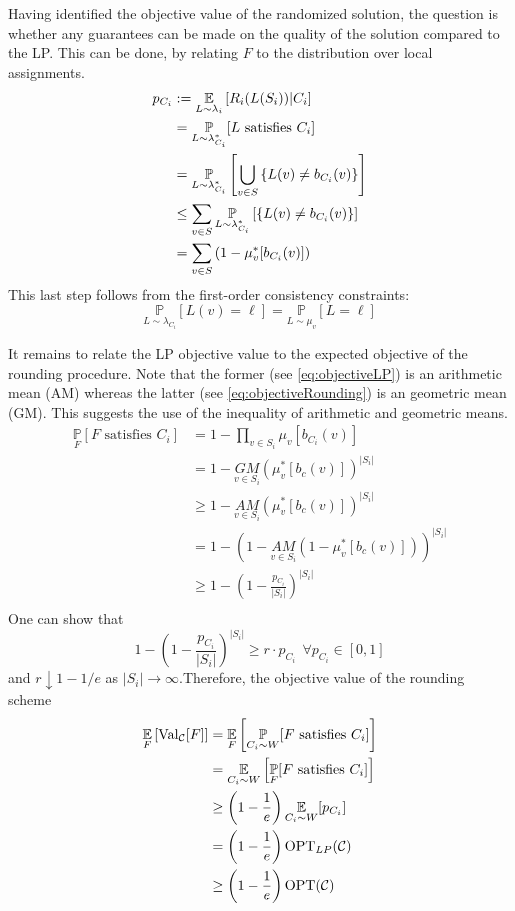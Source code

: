Having identified the objective value of the randomized solution, the question is whether any guarantees can be made on the quality of the solution compared to the LP. 
This can be done, by relating $F$ to the distribution over local assignments.
\begin{align}
	p_{C_i} &:=  \underset{L \sim \lambda_{i}}{\mathbb{E}} \left[ R_i( L (S_i )) |C_i \right]\nonumber\\
			&= \underset{L \sim \lambda_{C_i}^*}{\mathbb{P}} [L \text{ satisfies } C_i] \nonumber\\
			&=  \underset{L \sim \lambda_{C_i}^*}{\mathbb{P}}\left[ \bigcup_{v \in S} \left\{ L(v) \neq b_{C_i}(v) \right\} \right] \nonumber\\
			&\le \sum_{v \in  S } \underset{L \sim \lambda_{C_i}^*}{\mathbb{P}} \left[  \left\{ L(v) \neq b_{C_i}(v) \right\} \right] \nonumber\\
			&= \sum_{v \in S} \left( 1 - \mu_v^*[b_{C_i}(v)] \right) \label{eq:objectiveLP}
\end{align}
This last step follows from the first-order consistency constraints:
\[
	\underset{L \sim \lambda_{C_i} }{\mathbb{P}}[ L(v) = \ell] = \underset{L \sim \mu_v }{\mathbb{P}}[ L = \ell]
\]

It remains to relate the LP objective value to the expected objective of the rounding procedure. 
Note that the former (see \eqref{eq:objectiveLP}) is an arithmetic mean (AM) whereas the latter (see \eqref{eq:objectiveRounding}) is an geometric mean (GM). 
This suggests the use of the inequality of arithmetic and geometric means.
\begin{align*}
		\underset{F}{\mathbb{P}}[ F \text{ satisfies } C_i] &= 1 - \prod_{v \in S_i} \mu_v[b_{C_i}(v)]\\
		&= 1 - \underset{v \in S_i}{GM}(\mu_{v}^*[b_c(v)])^{|S_i|}\\
		&\ge 1 - \underset{v \in S_i}{AM}(\mu_{v}^*[b_c(v)])^{|S_i|}\\
		&= 1 - \left( 1  - \underset{v \in S_i}{AM}(1 -\mu_{v}^*[b_c(v)]) \right)^{|S_i|}\\
		&\ge 1 - \left( 1  - \frac{p_{C_i}}{|S_i|}\right)^{|S_i|}\\
\end{align*}
One can show that $$1 - \left( 1  - \frac{p_{C_i}}{|S_i|}\right)^{|S_i|} \geq r \cdot p_{C_i} ~\ \forall p_{C_i} \in [0, 1]$$ and $r \downarrow 1-1/e$ as $|S_i| \rightarrow \infty$.Therefore, the objective value of the rounding scheme
\begin{align*}
	\underset{F}{\mathbb{E}} \left[ \text{Val}_{\mathcal{C}}[F]\right] &= \underset{F}{\mathbb{E}}\left[ \underset{C_i \sim W}{\mathbb{P}}[ F \text{ satisfies } C_i] \right]\\
	&=  \underset{C_i \sim W}{\mathbb{E}}\left[ \underset{F}{\mathbb{P}}[ F \text{ satisfies } C_i] \right]\\
	&\ge \left( 1 - \frac{1}{e} \right) \underset{C_i \sim W}{\mathbb{E}} [ p_{C_i} ]\\
	&= \left( 1 - \frac{1}{e} \right) \text{OPT}_{LP}(\mathcal{C})\\
	&\ge \left( 1 - \frac{1}{e} \right) \text{OPT}(\mathcal{C})\\
\end{align*}

